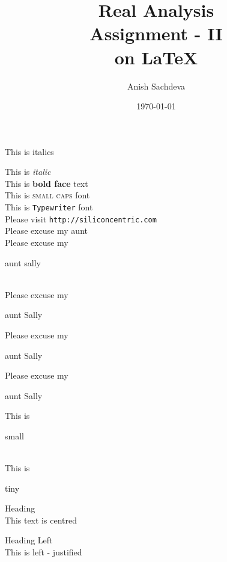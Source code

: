 \documentclass[11pt]{article}
\begin{document}
\tableofcontents

\title{	Real Analysis\\
Assignment - II\\
on \LaTeX}
\author{Anish Sachdeva}
\date{\today}
\maketitle


This is italics

This is \textit{italic}\\

This is \textbf{bold face} text\\

This is \textsc{small caps} font\\

This is \texttt{Typewriter} font\\
Please visit \texttt{http://siliconcentric.com}\\


Please excuse my aunt\\
Please excuse my \begin{large}
aunt sally
\end{large}\\
Please excuse my \begin{Large}
aunt Sally
\end{Large}

Please excuse my \begin{huge}
aunt Sally
\end{huge}

Please excuse my 
\begin{Huge}
aunt Sally
\end{Huge}

This is \begin{small}
small
\end{small}\\
This is \begin{tiny}
tiny
\end{tiny}



\begin{center}
Heading\\
This text is centred
\end{center}

\begin{flushleft}
Heading Left\\
This is left - justified
\end{flushleft}
\end{document}
